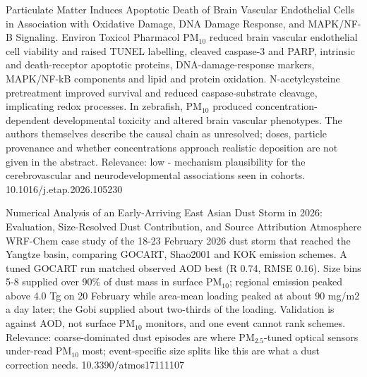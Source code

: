 \documentclass[10pt]{article}
\begin{document}
{Particulate Matter Induces Apoptotic Death of Brain Vascular Endothelial Cells in Association with Oxidative Damage, DNA Damage Response, and MAPK/NF-B Signaling.}
{Environ Toxicol Pharmacol}
{PM$_{10}$ reduced brain vascular endothelial cell viability and raised TUNEL labelling, cleaved caspase-3 and PARP, intrinsic and death-receptor apoptotic proteins, DNA-damage-response markers, MAPK/NF-kB components and lipid and protein oxidation. N-acetylcysteine pretreatment improved survival and reduced caspase-substrate cleavage, implicating redox processes. In zebrafish, PM$_{10}$ produced concentration-dependent developmental toxicity and altered brain vascular phenotypes. The authors themselves describe the causal chain as unresolved; doses, particle provenance and whether concentrations approach realistic deposition are not given in the abstract. Relevance: low - mechanism plausibility for the cerebrovascular and neurodevelopmental associations seen in cohorts.}
{10.1016/j.etap.2026.105230}

\par{}\baselineskip{}\baselineskip
{}

{Numerical Analysis of an Early-Arriving East Asian Dust Storm in 2026: Evaluation, Size-Resolved Dust Contribution, and Source Attribution}
{Atmosphere}
{WRF-Chem case study of the 18-23 February 2026 dust storm that reached the Yangtze basin, comparing GOCART, Shao2001 and KOK emission schemes. A tuned GOCART run matched observed AOD best (R 0.74, RMSE 0.16). Size bins 5-8 supplied over 90\% of dust mass in surface PM$_{10}$; regional emission peaked above 4.0 Tg on 20 February while area-mean loading peaked at about 90 mg/m2 a day later; the Gobi supplied about two-thirds of the loading. Validation is against AOD, not surface PM$_{10}$ monitors, and one event cannot rank schemes. Relevance: coarse-dominated dust episodes are where PM$_{2.5}$-tuned optical sensors under-read PM$_{10}$ most; event-specific size splits like this are what a dust correction needs.}
{10.3390/atmos17111107}
\end{document}
